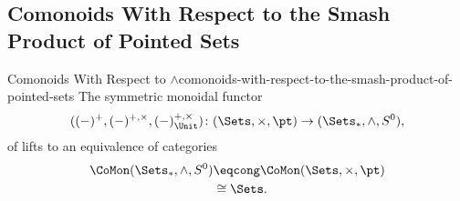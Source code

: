 \subsection{Comonoids With Respect to the Smash Product of Pointed Sets}\label{subsection-comonoids-with-respect-to-the-smash-product-of-pointed-sets}
\begin{proposition}{Comonoids With Respect to $\wedge$}{comonoids-with-respect-to-the-smash-product-of-pointed-sets}%
    The symmetric monoidal functor
    \[
        ((-)^{+},(-)^{+,\times},(-)^{+,\times}_{\Unit})
        \colon
        (\Sets,\times,\pt)
        \to
        (\Sets_{*},\wedge,S^{0}),
    \]%
    of  lifts to an equivalence of categories
    \begin{align*}
        \CoMon(\Sets_{*},\wedge,S^{0}) &\eqcong \CoMon(\Sets,\times,\pt)\\
                                       &\cong   \Sets.
    \end{align*}
\end{proposition}
